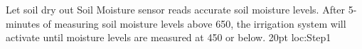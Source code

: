 {%
%
%
%
\tpStep%
{Let soil dry out}
{Soil Moisture sensor reads accurate soil moisture levels. After 5-minutes of measuring soil moisture levels above 650, the irrigation system will activate until moisture levels are measured at 450 or below.}
{20pt}
{loc:Step1}
%
%
%
%
%
}%


